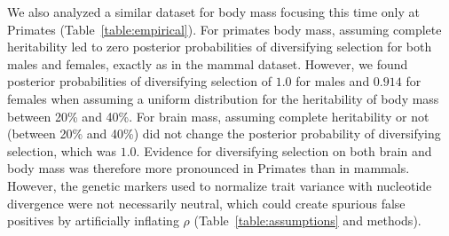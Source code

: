 \documentclass{article}
\newcommand{\NI}{\rho}
\begin{document}
We also analyzed a similar dataset for body mass focusing this time only at Primates (Table~\ref{table:empirical}).
For primates body mass, assuming complete heritability led to zero posterior probabilities of diversifying selection for both males and females, exactly as in the mammal dataset.
However, we found posterior probabilities of diversifying selection of $1.0$ for males and $0.914$ for females when assuming a uniform distribution for the heritability of body mass between 20\% and 40\%.
For brain mass, assuming complete heritability or not (between 20\% and 40\%) did not change the posterior probability of diversifying selection, which was $1.0$.
Evidence for diversifying selection on both brain and body mass was therefore more pronounced in Primates than in mammals.
However, the genetic markers used to normalize trait variance with nucleotide divergence were not necessarily neutral, which could create spurious false positives by artificially inflating $\NI$ (Table~\ref{table:assumptions} and methods).
\end{document}
